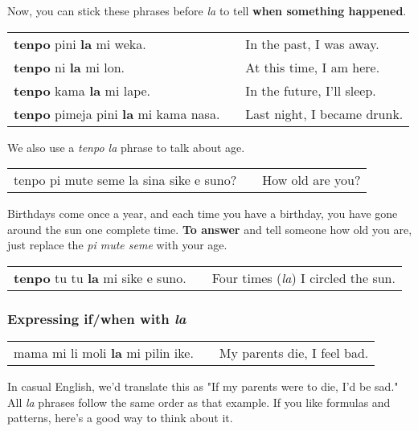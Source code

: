 Now, you can stick these phrases before \textit{la} to tell \textbf{when something happened}. 

\begin{supertabular}{p{5,5cm}|ll}
\textbf{tenpo} pini \textbf{la} mi weka. && In the past, I was away. \\
\textbf{tenpo} ni \textbf{la} mi lon. && At this time, I am here. \\
\textbf{tenpo} kama \textbf{la} mi lape. && In the future, I'll sleep. \\
\textbf{tenpo} pimeja pini \textbf{la} mi kama nasa. && Last night, I became drunk. \\
\end{supertabular} 

We also use a \textit{tenpo la} phrase to talk about age. 

\begin{supertabular}{p{5,5cm}|ll}
tenpo pi mute seme la sina sike e suno? && How old are you? \\
\end{supertabular} 

Birthdays come once a year, and each time you have a birthday, you have gone around the sun one complete time. 
\textbf{To answer} and tell someone how old you are, just replace the \textit{pi mute seme} with your age.

\begin{supertabular}{p{5,5cm}|ll}
\textbf{tenpo} tu tu \textbf{la} mi sike e suno. && Four times (\textit{la}) I circled the sun. \\
\end{supertabular} 
%
\subsubsection*{Expressing if/when with \textit{la}}
%
\begin{supertabular}{p{5,5cm}|ll}
mama mi li moli \textbf{la} mi pilin ike. && My parents die, I feel bad. \\
\end{supertabular} 

In casual English, we'd translate this as "If my parents were to die, I'd be sad." 
All \textit{la} phrases follow the same order as that example. 
If you like formulas and patterns, here's a good way to think about it. 

